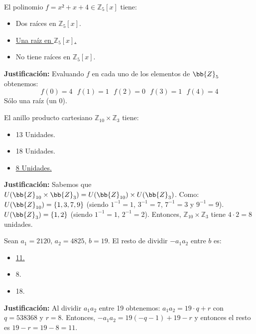 \documentclass[12pt]{article}
\newcounter{ejercicio}[section] %
\newcounter{ejercicio}
\newcommand{\resetearcontador}{%
  \setcounter{ejercicio}{0} %
}
\begin{document}
    \resetearcontador

    \newpage
    \ 
    \newpage

    
    \begin{ejercicio}
        El polinomio $f = x² + x + 4 \in \mathbb{Z}_5[x]$ tiene:
        \begin{itemize}
            \item Dos raíces en $\mathbb{Z}_5[x]$.
            \item \underline{Una raíz en $\mathbb{Z}_5[x]$.}
            \item No tiene raíces en $\mathbb{Z}_5[x]$.
        \end{itemize}
        \textbf{Justificación:}\newline
        Evaluando $f$ en cada uno de los elementos de $\bb{Z}_5$ obtenemos:
        $$f(0) = 4~~~f(1)=1~~~f(2)=0~~~f(3)=1~~~f(4)=4$$
        Sólo una raíz (un 0).
    \end{ejercicio}

    \begin{ejercicio}
        El anillo producto cartesiano $\mathbb{Z}_{10} \times \mathbb{Z}_3$ tiene:
        \begin{itemize}
            \item 13 Unidades.
            \item 18 Unidades.
            \item \underline{8 Unidades.}
        \end{itemize}
        \textbf{Justificación:}\newline
        Sabemos que $U(\bb{Z}_{10} \times \bb{Z}_3) = U(\bb{Z}_{10})\times U(\bb{Z}_3)$.\newline
        Como: $U(\bb{Z}_{10}) = \{1, 3, 7, 9\}$ (siendo $1^{-1} = 1$, $3^{-1}=7$, $7^{-1}=3$ y $9^{-1}=9$).\newline
        $U(\bb{Z}_3) = \{1, 2\}$ (siendo $1^{-1}=1$, $2^{-1}=2$).\newline
        Entonces, $\mathbb{Z}_{10} \times \mathbb{Z}_3$ tiene $4\cdot 2 = 8$ unidades.
    \end{ejercicio}

    \begin{ejercicio}
        Sean $a_1 = 2120$, $a_2 = 4825$, $b = 19$. El resto de dividir $-a_1a_2$ entre $b$ es:
        \begin{itemize}
            \item \underline{11.}
            \item 8.
            \item 18.
        \end{itemize}
        \textbf{Justificación:}\newline
        Al dividir $a_1a_2$ entre 19 obtenemos: $a_1a_2 = 19\cdot q + r$ con $q = 538368$ y $r = 8$.\newline
        Entonces, $-a_1a_2 = 19(-q-1)+19-r$ y entonces el resto es $19 - r = 19 -8 = 11$.
    \end{ejercicio}
\end{document}
